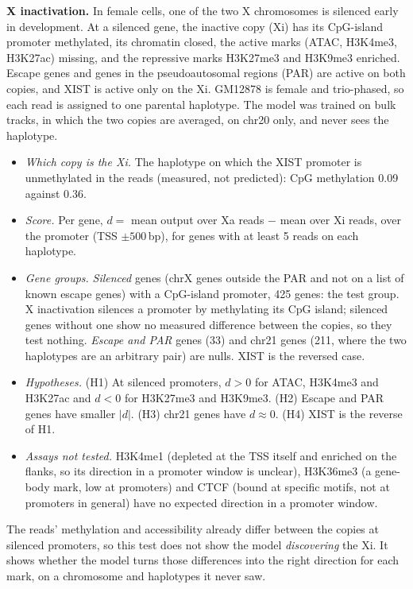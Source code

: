 \documentclass[acmtog,nonacm]{acmart}   %
\begin{document}
\textbf{X inactivation.} In female cells, one of the two X chromosomes is silenced early in development. At a
silenced gene, the inactive copy (Xi) has its CpG-island promoter methylated, its chromatin closed, the active marks
(ATAC, H3K4me3, H3K27ac) missing, and the repressive marks H3K27me3 and H3K9me3 enriched. Escape genes and genes in
the pseudoautosomal regions (PAR) are active on both copies, and XIST is active only on the Xi. GM12878 is female
and trio-phased, so each read is assigned to one parental haplotype. The model was trained on bulk tracks, in which
the two copies are averaged, on chr20 only, and never sees the haplotype.
\begin{itemize}
  \item \emph{Which copy is the Xi.} The haplotype on which the XIST promoter is unmethylated in the reads
    (measured, not predicted): CpG methylation 0.09 against 0.36.
  \item \emph{Score.} Per gene, $d=$ mean output over Xa reads $-$ mean over Xi reads, over the promoter
    (TSS $\pm500$\,bp), for genes with at least 5 reads on each haplotype.
  \item \emph{Gene groups.} \emph{Silenced} genes (chrX genes outside the PAR and not on a list of known escape
    genes) with a CpG-island promoter, 425 genes: the test group. X inactivation silences a promoter by methylating
    its CpG island; silenced genes without one show no measured difference between the copies, so they test
    nothing. \emph{Escape and PAR} genes (33) and chr21 genes (211, where the two haplotypes are an arbitrary pair)
    are nulls. XIST is the reversed case.
  \item \emph{Hypotheses.} (H1) At silenced promoters, $d>0$ for ATAC, H3K4me3 and H3K27ac and $d<0$ for H3K27me3
    and H3K9me3. (H2) Escape and PAR genes have smaller $|d|$. (H3) chr21 genes have $d\approx0$. (H4) XIST is the
    reverse of H1.
  \item \emph{Assays not tested.} H3K4me1 (depleted at the TSS itself and enriched on the flanks, so its direction
    in a promoter window is unclear), H3K36me3 (a gene-body mark, low at promoters) and CTCF (bound at specific
    motifs, not at promoters in general) have no expected direction in a promoter window.
\end{itemize}
The reads' methylation and accessibility already differ between the copies at silenced promoters, so this test
does not show the model \emph{discovering} the Xi. It shows whether the model turns those differences into the
right direction for each mark, on a chromosome and haplotypes it never saw.
\end{document}
